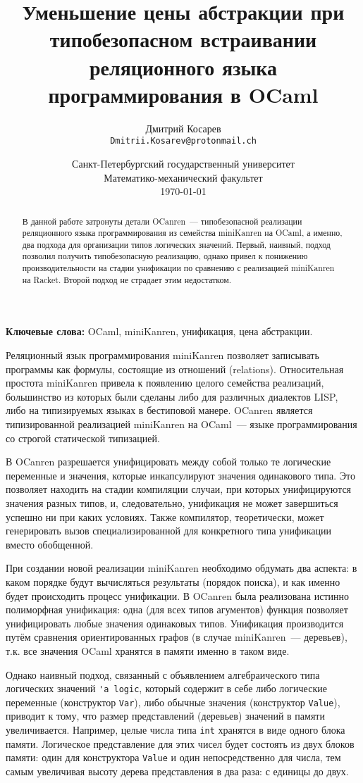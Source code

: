 \documentclass[10pt]{article}
\title{Уменьшение цены абстракции при типобезопасном встраивании реляционного языка программирования в OCaml}
\author{
        Дмитрий Косарев\\ \texttt{Dmitrii.Kosarev@protonmail.ch}
}
\date{
  Санкт-Петербургский государственный университет\\
  Математико-механический факультет\\
  \today
}
\begin{document}
\maketitle

\begin{abstract}
В данной работе затронуты детали OCanren~--- типобезопасной реализации реляционного языка программирования
из семейства miniKanren на OCaml, а именно, два подхода для организации типов логических значений. Первый,
наивный, подход позволил получить типобезопасную реализацию, однако привел к понижению производительности
на стадии унификации по сравнению с реализацией miniKanren на Racket. Второй подход не страдает этим 
недостатком.

\end{abstract}

\textbf{Ключевые слова:} OCaml, miniKanren, унификация, цена абстракции.

\vspace{5mm}

Реляционный язык программирования miniKanren позволяет записывать программы как формулы, состоящие из отношений
(relations). Относительная простота miniKanren привела к появлению целого семейства реализаций, большинство из
которых были сделаны либо для различных диалектов LISP, либо на типизируемых языках в бестиповой манере. OCanren 
является типизированной реализацией miniKanren на OCaml~--- языке программирования со строгой статической 
типизацией.

В OCanren разрешается унифицировать между собой только те логические переменные и значения, которые инкапсулируют
значения одинакового типа. Это позволяет находить на стадии компиляции случаи, при которых унифицируются 
значения разных типов, и, следовательно, унификация не может завершиться успешно ни при каких условиях. Также
компилятор, теоретически, может генерировать вызов специализированной для конкретного типа унификации вместо 
обобщенной.

При создании новой реализации miniKanren необходимо обдумать два аспекта: в каком порядке будут вычисляться 
результаты (порядок поиска), и как именно будет происходить процесс унификации. В OCanren была реализована истинно 
полиморфная унификация: одна (для всех типов агументов) функция позволяет унифицировать любые значения одинаковых типов. 
Унификация производится
путём сравнения ориентированных графов (в случае miniKanren~--- деревьев), т.к. все значения OCaml хранятся в 
памяти именно в таком виде.

Однако наивный подход, связанный с объявлением алгебраического типа логических значений \verb|'a logic|, который содержит в себе 
либо логические переменные (конструктор \verb|Var|), либо обычные значения (конструктор \verb|Value|), приводит к тому, что 
размер представлений (деревьев) значений в памяти увеличивается. 
Например, целые числа типа \verb|int| хранятся в виде одного блока памяти. Логическое представление для этих чисел
будет состоять из двух блоков памяти: один для конструктора \verb|Value| и один непосредственно для числа, тем 
самым увеличивая высоту дерева представления в два раза: с единицы до двух. 
\end{document}
